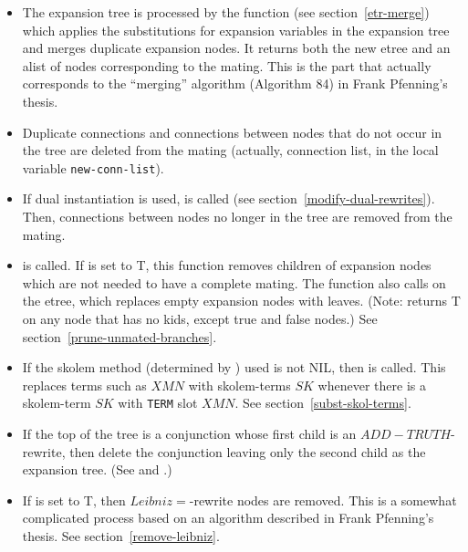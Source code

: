 \begin{itemize}
\item The expansion tree is processed by the function
 (see section~\ref{etr-merge}) which applies the substitutions for
expansion variables in the expansion tree and merges duplicate expansion nodes.
It returns both the new etree and an alist of nodes corresponding to the
mating.  This is the part that actually corresponds to
the ``merging'' algorithm (Algorithm 84) in Frank Pfenning's thesis\cite{Pfenning86}.

\item Duplicate connections and
connections between nodes that do not occur in the tree
are deleted from the mating
(actually, connection list, in the
local variable \verb+new-conn-list+).

\item If dual instantiation\cite{Bishop98} is used, 
is called (see section~\ref{modify-dual-rewrites}).
Then, connections between nodes no longer in the tree are
removed from the mating.

\item {} is called.
If  is set to T,
this function removes children of expansion nodes
which are not needed to have a complete mating.
The function also calls  on the etree,
which replaces empty expansion nodes with leaves.  (Note: 
returns T on any node that has no kids, except true and false nodes.)
See section~\ref{prune-unmated-branches}.

\item If the skolem method (determined by ) used
is not NIL, then
 is called. 
This replaces terms such as $X M N$ with skolem-terms $SK$
whenever there is a skolem-term $SK$ with \verb+TERM+
slot $X M N$.
See section~\ref{subst-skol-terms}.

\item If the top of the tree is a conjunction whose
first child is an $ADD-TRUTH$-rewrite, then delete the conjunction
leaving only the second child as the expansion tree.
(See  and .)

\item If  is set to T,
then $Leibniz=$-rewrite nodes are removed.  This is a somewhat
complicated process based on an algorithm described in Frank Pfenning's
thesis\cite{Pfenning86}.  See section~\ref{remove-leibniz}.


\end{itemize}
